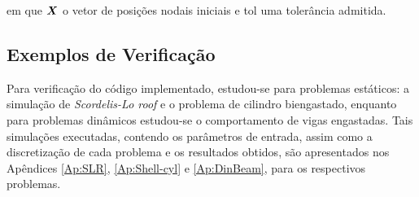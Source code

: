 \noindent em que $\boldsymbol{X}$ o vetor de posições nodais iniciais e tol uma tolerância admitida.

%
%

\subsection{Exemplos de Verificação} \label{MEFP-Ex}

Para verificação do código implementado, estudou-se para problemas estáticos: a simulação de \textit{Scordelis-Lo roof} e o problema de cilindro biengastado, enquanto para problemas dinâmicos estudou-se o comportamento de vigas engastadas. Tais simulações executadas, contendo os parâmetros de entrada, assim como a discretização de cada problema e os resultados obtidos, são apresentados nos Apêndices \ref{Ap:SLR}, \ref{Ap:Shell-cyl} e \ref{Ap:DinBeam}, para os respectivos problemas.